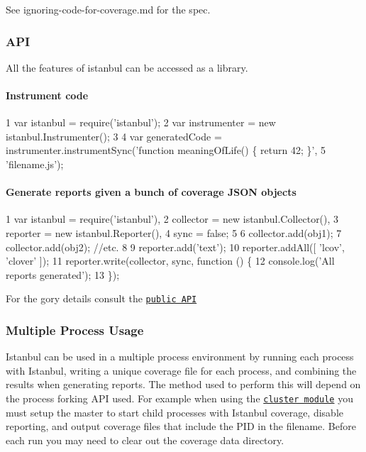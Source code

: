 See ignoring-\/code-\/for-\/coverage.md for the spec.

\subsubsection*{A\+P\+I}

All the features of istanbul can be accessed as a library.

\paragraph*{Instrument code}


\begin{DoxyCode}
1 var istanbul = require('istanbul');
2 var instrumenter = new istanbul.Instrumenter();
3 
4 var generatedCode = instrumenter.instrumentSync('function meaningOfLife() \{ return 42; \}',
5     'filename.js');
\end{DoxyCode}


\paragraph*{Generate reports given a bunch of coverage J\+S\+O\+N objects}


\begin{DoxyCode}
1 var istanbul = require('istanbul'),
2     collector = new istanbul.Collector(),
3     reporter = new istanbul.Reporter(),
4     sync = false;
5 
6 collector.add(obj1);
7 collector.add(obj2); //etc.
8 
9 reporter.add('text');
10 reporter.addAll([ 'lcov', 'clover' ]);
11 reporter.write(collector, sync, function () \{
12     console.log('All reports generated');
13 \});
\end{DoxyCode}


For the gory details consult the \href{http://gotwarlost.github.com/istanbul/public/apidocs/index.html}{\tt public A\+P\+I}

\subsubsection*{Multiple Process Usage}

Istanbul can be used in a multiple process environment by running each process with Istanbul, writing a unique coverage file for each process, and combining the results when generating reports. The method used to perform this will depend on the process forking A\+P\+I used. For example when using the \href{http://nodejs.org/api/cluster.html}{\tt cluster module} you must setup the master to start child processes with Istanbul coverage, disable reporting, and output coverage files that include the P\+I\+D in the filename. Before each run you may need to clear out the coverage data directory.


